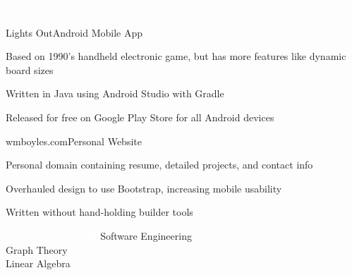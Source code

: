 \documentclass{resume}
\begin{document}
\begin{rSection}{\colorbox{NCSURED}{\textcolor{WHITE}{Projects}}}
	\begin{rSubsection}{Lights Out}{Android Mobile App}{}{}
		\item Based on 1990's handheld electronic game, but has more features like dynamic board sizes
		\item Written in Java using Android Studio with Gradle
		\item Released for free on Google Play Store for all Android devices
	\end{rSubsection}
	
	\begin{rSubsection}{wmboyles.com}{Personal Website}{}{}
		\item Personal domain containing resume, detailed projects, and contact info
		\item Overhauled design to use Bootstrap, increasing mobile usability
		\item Written without hand-holding builder tools
	\end{rSubsection}	
\end{rSection}

\begin{rSection}{\colorbox{NCSURED}{\textcolor{WHITE}{Relevant Coursework}}}
	{Software Engineering}
	 \\
	{Graph Theory}
	 \\
	{ Linear Algebra}
\end{rSection}
\end{document}
